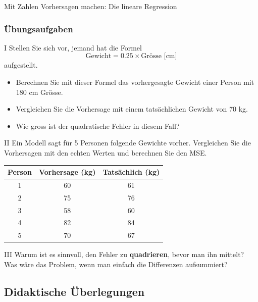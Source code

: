 \begin{lpu}{Mit Zahlen Vorhersagen machen: Die lineare Regression}
\subsubsection*{Übungsaufgaben}

\begin{aufgabe}{I}
Stellen Sie sich vor, jemand hat die Formel  
\[
\text{Gewicht} = 0.25 \times \text{Grösse [cm]}
\]  
aufgestellt.  
\begin{itemize}
  \item Berechnen Sie mit dieser Formel das vorhergesagte Gewicht einer Person mit 180 cm Grösse.
  \item Vergleichen Sie die Vorhersage mit einem tatsächlichen Gewicht von 70 kg.  
  \item Wie gross ist der quadratische Fehler in diesem Fall?
\end{itemize}
\end{aufgabe}

\begin{aufgabe}{II}
Ein Modell sagt für 5 Personen folgende Gewichte vorher.  
Vergleichen Sie die Vorhersagen mit den echten Werten und berechnen Sie den MSE.

\begin{center}
\begin{tabular}{|c|c|c|}
\hline
\textbf{Person} & \textbf{Vorhersage (kg)} & \textbf{Tatsächlich (kg)} \\
\hline
1 & 60 & 61 \\
2 & 75 & 76 \\
3 & 58 & 60 \\
4 & 82 & 84 \\
5 & 70 & 67 \\
\hline
\end{tabular}
\end{center}
\end{aufgabe}

\begin{aufgabe}{III}
Warum ist es sinnvoll, den Fehler zu \textbf{quadrieren}, bevor man ihn mittelt? Was wäre das Problem, wenn man einfach die Differenzen aufsummiert?
\end{aufgabe}

    
\end{lpu}



\subsection*{Didaktische Überlegungen}

